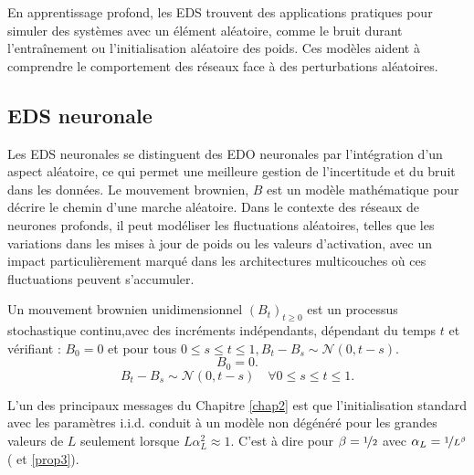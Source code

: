 En apprentissage profond, les EDS trouvent des applications pratiques pour simuler des systèmes avec un élément aléatoire, comme le bruit durant l'entraînement ou l'initialisation aléatoire des poids. Ces modèles aident à comprendre le comportement des réseaux face à des perturbations aléatoires.

\subsection{EDS neuronale}
Les EDS neuronales se distinguent des EDO neuronales par l'intégration d'un aspect aléatoire, ce qui permet une meilleure gestion de l'incertitude et du bruit dans les données. Le mouvement brownien, $B$ est un modèle mathématique pour décrire le chemin d'une marche aléatoire. Dans le contexte des réseaux de neurones profonds, il peut modéliser les fluctuations aléatoires, telles que les variations dans les mises à jour de poids ou les valeurs d'activation, avec un impact particulièrement marqué dans les architectures multicouches où ces fluctuations peuvent s'accumuler.

\begin{definition}
Un mouvement brownien unidimensionnel $(B_t)_{t \geqslant 0} $ est un processus stochastique continu,avec des incréments indépendants, dépendant du temps $t$ et vérifiant : $B_0 = 0$ et pour tous $0 \leqslant s \le t \leqslant 1, B_t - B_s \sim \mathcal{N}(0,t-s)$.
\[
    B_0 = 0
.\]
\[
    B_t - B_s \sim \mathcal{N}(0,t-s)\quad \forall 0 \leqslant s \le t \leqslant 1
.\]
\end{definition}

L'un des principaux messages du Chapitre \ref{chap2} est que l'initialisation standard avec les paramètres i.i.d. conduit à un modèle non dégénéré pour les grandes valeurs de $L$ seulement lorsque $L\alpha_L^2 \approx 1$. C'est à dire pour $\beta = \nicefrac{1}{2}$ avec $\alpha_L=\nicefrac{1}{L^{\beta}}$ ( et \ref{prop3}).

